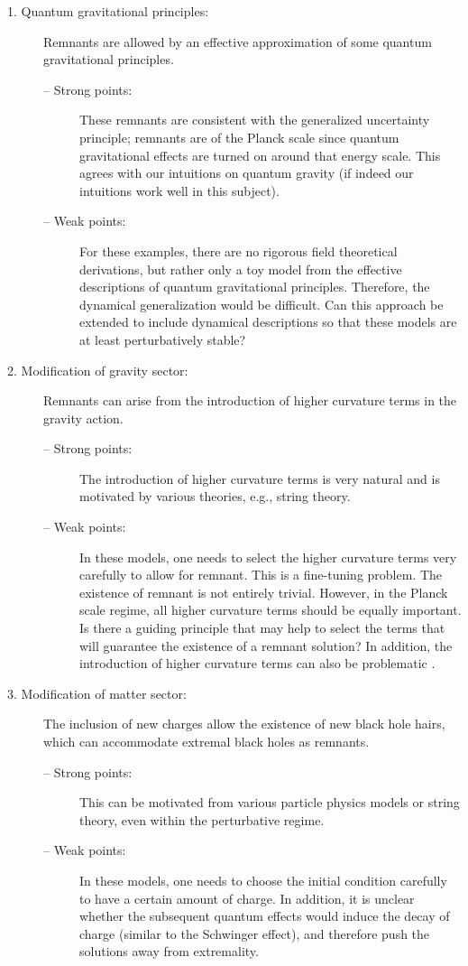 \documentclass[12pt]{article}
\newcommand{\2}{$^2$}
\newcommand{\3}{$^3$}
\newcommand{\4}{$_4$}
\newcommand{\5}{$_5$}
\begin{document}
\begin{description}
\item[1. Quantum gravitational principles:] Remnants are allowed by an effective approximation of  some quantum gravitational principles.
\begin{description}
\item[-- Strong points:] These remnants are consistent with the generalized uncertainty principle; remnants are of the Planck scale since quantum gravitational effects are turned on around that energy scale. This agrees with our intuitions on quantum gravity (if indeed our intuitions work well in this subject).
\item[-- Weak points:] For these examples, there are no rigorous field theoretical derivations, but rather only a toy model from the effective descriptions of quantum gravitational principles. Therefore, the dynamical generalization would be difficult. Can this approach be extended to include dynamical descriptions so that these models are at least perturbatively stable?
\end{description}
\item[2. Modification of gravity sector:] Remnants can arise from the introduction of higher curvature terms in the gravity action.
\begin{description}
\item[-- Strong points:] The introduction of higher curvature terms is very natural and is motivated by various theories, e.g., string theory.
\item[-- Weak points:] In these models, one needs to select the higher curvature terms very carefully to allow for remnant. This is a fine-tuning problem. The existence of remnant is not entirely trivial. However, in the Planck scale regime, all higher curvature terms should be equally important. Is there a guiding principle that may help to select the terms that will guarantee the existence of a remnant solution? In addition, the introduction of higher curvature terms can also be problematic \cite{camanho}.
\end{description}
\item[3. Modification of matter sector:] The inclusion of new charges allow the existence of new black hole hairs, which can accommodate extremal black holes as remnants.
\begin{description}
\item[-- Strong points:] This can be motivated from various particle physics models or string theory, even within the perturbative regime.
\item[-- Weak points:] In these models, one needs to choose the initial condition carefully to have a certain amount of charge. In addition, it is unclear whether the subsequent quantum effects would induce the decay of charge (similar to the Schwinger effect), and therefore push the solutions away from extremality.
\end{description}
\end{description}
\end{document}
